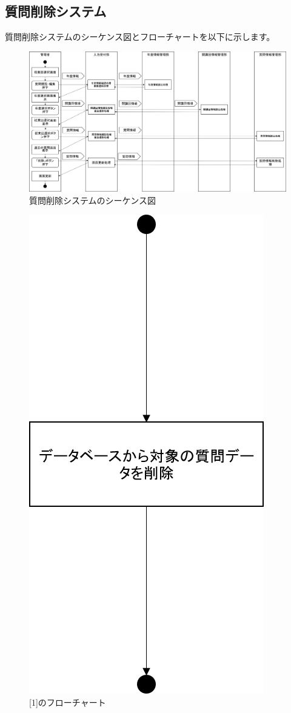\newpage
\subsection{質問削除システム}
質問削除システムのシーケンス図とフローチャートを以下に示します。

\begin{figure}[htbp]
  \begin{center}
    \includegraphics[width=1\linewidth,clip]{./img/q_delete/main.png}
    \caption{質問削除システムのシーケンス図}\label{fig:qdeleteseaquence}
  \end{center}
\end{figure}

\begin{figure}[htbp]
  \begin{center}
    \includegraphics[width=0.4\linewidth,clip]{./img/q_delete/sub1.png}
    \caption{[1]のフローチャート}\label{fig:qdeleteflow0}
  \end{center}
\end{figure}

\newpage
